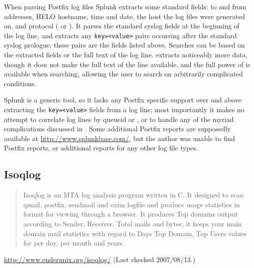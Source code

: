 When parsing Postfix log files Splunk extracts some standard fields: to and
from addresses, HELO hostname, time and date, the host the log files were
generated on, and protocol (\SMTP{} or \ESMTP{}).  It parses the standard
syslog fields at the beginning of the log line, and extracts any
\texttt{key=<value>} pairs occurring after the standard syslog prologue;
these pairs are the fields listed above.  Searches can be based on the
extracted fields or the full text of the log line.  \parsername{} extracts
noticeably more data, though it does not make the full text of the line
available, and the full power of \SQL{} is available when searching,
allowing the user to search on arbitrarily complicated conditions.

Splunk is a generic tool, so it lacks any Postfix specific support over and
above extracting the \texttt{key=<value>} fields from a log line; most
importantly it makes no attempt to correlate log lines by queueid or
\pid{}, or to handle any of the myriad complications discussed in
.  Some additional Postfix reports are supposedly
available at \url{http://www.splunkbase.com/}, but the author was unable to
find Postfix reports, or additional reports for any other log file types.

\subsection{Isoqlog}

\begin{quotation}

    Isoqlog is an MTA log analysis program written in C. It designed to
    scan qmail, postfix, sendmail and exim logfile and produce usage
    statistics in \HTML{} format for viewing through a browser. It produces
    Top domains output according to Sender, Receiver, Total mails and
    bytes; it keeps your main domain mail statistics with regard to Days
    Top Domain, Top Users values for per day, per month and years.

\end{quotation}

\noindent{}\url{http://www.enderunix.org/isoqlog/} \newline{}
(Last checked 2007/08/13.)

